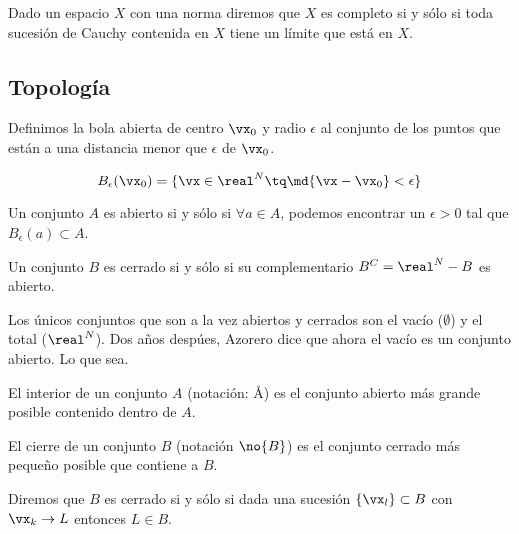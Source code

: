 \documentclass[12pt,a4paper,titlepage]{apuntes}
\begin{document}
\begin{defn} Dado un espacio $X$ con una norma diremos que $X$ es completo si y sólo si toda sucesión de Cauchy contenida en $X$ tiene un límite que está en $X$.\end{defn}

\subsection{Topología}

\begin{defn}
Definimos la bola abierta de centro $\vx_0$ y radio $\epsilon$ al conjunto de los puntos que están a una distancia menor que $\epsilon$ de $\vx_0$.

\[B_\epsilon (\vx_0) = \{ \vx \in \real^N \tq \md{\vx-\vx_0} < \epsilon\}\]
\end{defn}

\begin{defn}
Un conjunto $A$ es abierto si y sólo si $\forall a\in A$, podemos encontrar un $\epsilon >0$ tal que $B_\epsilon(a)\subset A$.\end{defn}

\begin{defn}
Un conjunto $B$ es cerrado si y sólo si su complementario $B^C=\real^N-B$ es abierto.
\end{defn}

\begin{remark} Los únicos conjuntos que son a la vez abiertos y cerrados son el vacío ($\emptyset$) y el total ($\real^N$). Dos años despúes, Azorero dice que ahora el vacío es un conjunto abierto. Lo que sea.\end{remark}

\begin{defn}[Interior] El interior de un conjunto $A$ (notación: \r{A}) es el conjunto abierto más grande posible contenido dentro de $A$.\end{defn}

\begin{defn}[Cierre] El cierre de un conjunto $B$ (notación $\no{B}$) es el conjunto cerrado más pequeño posible que contiene a $B$.\end{defn} 

\begin{theorem}
Diremos que $B$ es cerrado si y sólo si dada una sucesión $\{\vx_l\}\subset B$ con $\vx_k\to L$ entonces $L\in B$.
\end{theorem}
\end{document}
